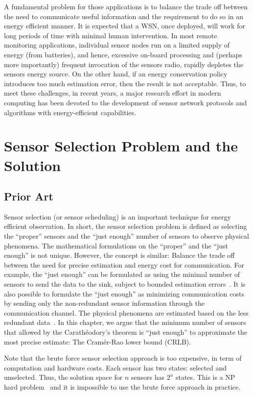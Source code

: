 A fundamental problem for those applications is to balance the trade off between the need to communicate useful information and the requirement to do so in an energy efficient manner.
    It is expected that a WSN, once deployed, will work for long periods of time with
minimal human intervention. In most remote monitoring applications,
individual sensor nodes run on a limited supply of energy (from batteries), and hence, excessive on-board processing and (perhaps more importantly) frequent invocation of the sensors radio, rapidly depletes the sensors energy source.
    On the other hand, if an energy conservation policy introduces too much estimation error, then the result is not acceptable.
    Thus, to meet these challenges, in recent years, a major research effort in modern computing has been devoted to the development of sensor network protocols and algorithms with energy-efficient capabilities.


\section{Sensor Selection Problem and the Solution}\label{s:problemsolution}
\subsection{Prior Art}\label{s:prior}
 Sensor selection (or sensor scheduling) is an important technique for energy efficient observation.
    In short, the sensor selection problem is defined as selecting the ``proper'' sensors and the ``just enough'' number of sensors to observe physical phenomena. The mathematical formulations on the ``proper'' and the ``just enough'' is not unique.
    However, the concept is similar: Balance the trade off between the need for precise estimation and energy cost for communication.  For example, the ``just enough'' can be formulated as using the minimal number of sensors to send the data to the sink, subject to bounded estimation errors~\cite{SAM2006Amit}. It is also possible to formulate the ``just enough'' as minimizing communication costs by sending only the non-redundant sensor information through the communication channel. The physical phenomena are estimated based on the less redundant data~\cite{FZhaoShinInfoDrivenDynamicTracking}. In this chapter, we argue that the minimum number of sensors that allowed by the Carath\'{e}odory's theorem is ``just enough'' to approximate the most precise estimate: The Cram\'{e}r-Rao lower bound (CRLB).


Note that the brute force sensor selection approach is too expensive, in term of computation and hardware costs. Each sensor has two states: selected and unselected. Thus, the solution space for $n$ sensors has $2^n$ states. This is a NP hard problem~\cite{isler06tase} and it is impossible to use the brute force approach in practice.


